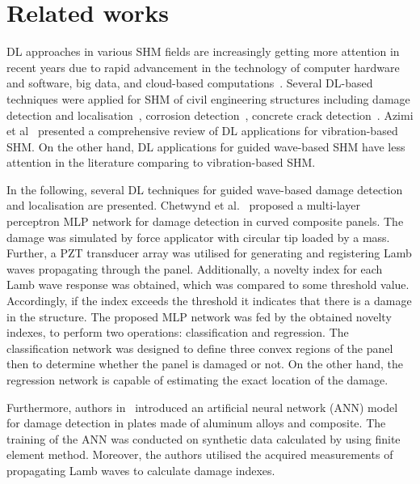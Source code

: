 \section{Related works}
\label{related_works}
DL approaches in various SHM fields are increasingly getting more attention in recent years due to rapid advancement in the technology of computer hardware and software, big data, and cloud-based computations~\cite{Azimi}.
Several DL-based techniques were applied for SHM of civil engineering structures including damage detection and localisation~\cite{Cha2018, Kong2018}, corrosion detection~\cite{Atha2018}, concrete crack detection~\cite{Dung2019}.
Azimi et al~\cite{Azimi} presented a comprehensive review of DL applications for vibration-based SHM.
On the other hand, DL applications for guided wave-based SHM have less attention in the literature comparing to vibration-based SHM.

In the following, several DL techniques for guided wave-based damage detection and localisation are presented.
Chetwynd et al.~\cite{Chetwynd2008} proposed a multi-layer perceptron MLP network for damage detection in curved composite panels.
The damage was simulated by force applicator with circular tip loaded by a mass.
Further, a PZT transducer array was utilised for generating and registering Lamb waves propagating through the panel.
Additionally, a novelty index for each Lamb wave response was obtained,
which was compared to some threshold value. 
Accordingly, if the index exceeds the threshold it indicates that there is a damage in the structure. 
The proposed MLP network was fed by the obtained novelty indexes, to perform two operations: classification and regression. 
The classification network was designed to define three convex regions of the panel then to determine whether the panel is damaged or not. 
On the other hand, the regression network is capable of estimating the exact location of the damage.
 
Furthermore, authors in~\cite{DeFenza2015} introduced an artificial neural network (ANN) model for damage detection in plates made of aluminum alloys and composite.
The training of the ANN was conducted on synthetic data calculated by using finite element method.
Moreover, the authors utilised the acquired measurements of propagating Lamb waves to calculate damage indexes.

